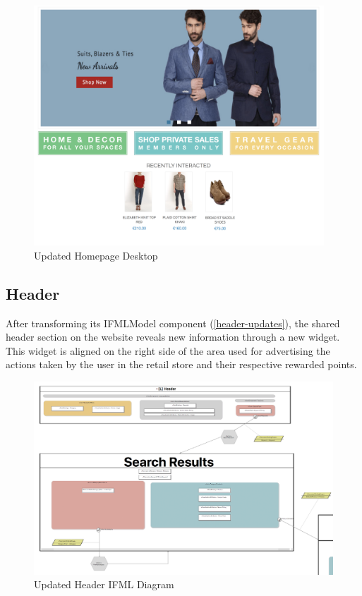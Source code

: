\begin{figure}[H]
  \centering
    \includegraphics[height=9cm]{images/diagrams/after/desktop-homepage.png}
  \caption{Updated Homepage Desktop}
  \label{fig:desktop-after-homepage}
\end{figure}
\vspace{0.5cm}

\newpage
\subsection{Header}

After transforming its IFMLModel component (\ref{header-updates}), the shared header section on the website reveals new information through a new widget. This widget is aligned on the right side of the area used for advertising the actions taken by the user in the retail store and their respective rewarded points.

\vspace{0.5cm}
\begin{figure}[H]
  \centering
    \includegraphics[width=14cm]{images/diagrams/after/ifml-header.png}
  \caption{Updated Header IFML Diagram}
  \label{fig:ifml-after-header}
\end{figure}

